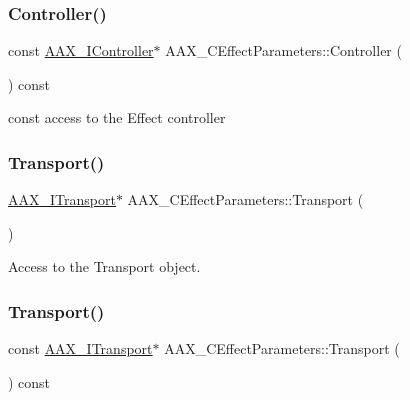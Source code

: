 \subsubsection{\texorpdfstring{Controller()}{Controller()}\hspace{0.1cm}{\footnotesize\ttfamily [2/2]}}
{\footnotesize\ttfamily const \mbox{\hyperlink{a01789}{A\+A\+X\+\_\+\+I\+Controller}}$\ast$ A\+A\+X\+\_\+\+C\+Effect\+Parameters\+::\+Controller (\begin{DoxyParamCaption}{ }\end{DoxyParamCaption}) const}



{\ttfamily const} access to the Effect controller 

\mbox{\label{a01481_af003e341f47eb1f170529db63066eca3}} 
\subsubsection{\texorpdfstring{Transport()}{Transport()}\hspace{0.1cm}{\footnotesize\ttfamily [1/2]}}
{\footnotesize\ttfamily \mbox{\hyperlink{a01885}{A\+A\+X\+\_\+\+I\+Transport}}$\ast$ A\+A\+X\+\_\+\+C\+Effect\+Parameters\+::\+Transport (\begin{DoxyParamCaption}{ }\end{DoxyParamCaption})}



Access to the Transport object. 

\mbox{\label{a01481_abd1c96049bff78dd21994824bdff0f03}} 
\subsubsection{\texorpdfstring{Transport()}{Transport()}\hspace{0.1cm}{\footnotesize\ttfamily [2/2]}}
{\footnotesize\ttfamily const \mbox{\hyperlink{a01885}{A\+A\+X\+\_\+\+I\+Transport}}$\ast$ A\+A\+X\+\_\+\+C\+Effect\+Parameters\+::\+Transport (\begin{DoxyParamCaption}{ }\end{DoxyParamCaption}) const}



